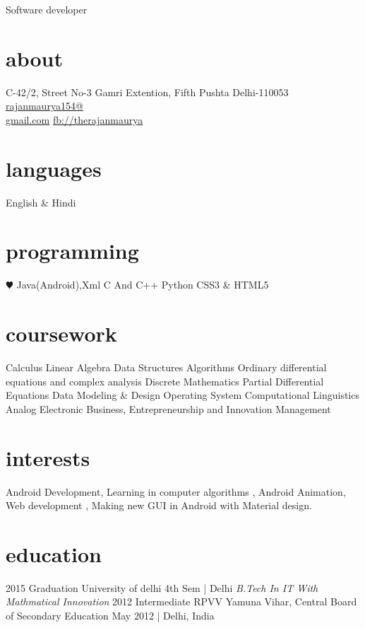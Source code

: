 \documentclass[]{friggeri-cv}
\begin{document}
       {Software developer}


\begin{aside}
  \section{about}
    C-42/2, Street No-3
    Gamri Extention,
    Fifth Pushta Delhi-110053
    ~
    \href{mailto:rajanmaurya154@gmail.com}{rajanmaurya154@\\gmail.com}
    \href{http://facebook.com/therajanmaurya}{fb://therajanmaurya}
  \section{languages}
    English \& Hindi
  \section{programming}
    {\color{red} $\varheartsuit$} Java(Android),Xml
    C And C++
    Python
    CSS3 \& HTML5
  \section{coursework}
    Calculus
    Linear Algebra
    Data Structures
    Algorithms
    Ordinary differential equations and
    complex analysis
    Discrete Mathematics
    Partial Differential Equations
    Data Modeling \& Design
    Operating System
    Computational Linguistics
    Analog Electronic
    Business, Entrepreneurship and
    Innovation Management
\end{aside}

\section{interests}

Android Development, Learning in computer algorithms , Android Animation, Web development , Making new GUI in Android with Material design.
 

\section{education}

\begin{entrylist}
  \entry
    {2015}
    {Graduation {\normalfont University of delhi}}
    {4th Sem | Delhi}
    {\emph{B.Tech In IT With Mathmatical Innovation}}
  \entry
    {2012} 
    {Intermediate}
    {RPVV Yamuna Vihar, Central Board of Secondary Education}
    {May 2012 | Delhi, India}
\end{entrylist}
\end{document}
